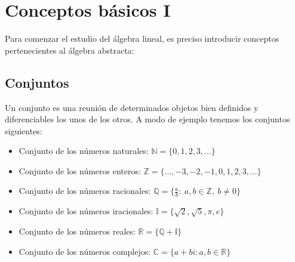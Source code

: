 




    
\chapter{Conceptos básicos I}
Para comenzar el estudio del álgebra lineal, es preciso introducir conceptos pertenecientes al álgebra abstracta:
\section{Conjuntos}
Un conjunto es una reunión de determinados objetos bien definidos y diferenciables los unos de los otros. A modo de ejemplo tenemos los conjuntos siguientes:

\begin{itemize}
\item Conjunto de los números naturales: $\mathbb{N}=\lbrace 0,1,2,3,... \rbrace$
\item Conjunto de los números enteros: $\mathbb{Z}=\lbrace ...,-3,-2,-1,0,1,2,3,... \rbrace$
\item Conjunto de los números racionales: $\mathbb{Q}=\lbrace \frac{a}{b}:\ a,b\in \mathbb{Z},\ b\neq 0 \rbrace$
\item Conjunto de los números iracionales: $\mathbb{I}=\lbrace \sqrt{2}, \sqrt{5}, \pi, e  \rbrace$
\item Conjunto de los números reales: $\mathbb{R}=\lbrace \mathbb{Q} +\mathbb{I}\rbrace$
\item Conjunto de los números complejos: $\mathbb{C}=\lbrace a+bi: a,b\in \mathbb{R}\rbrace$
\end{itemize}

